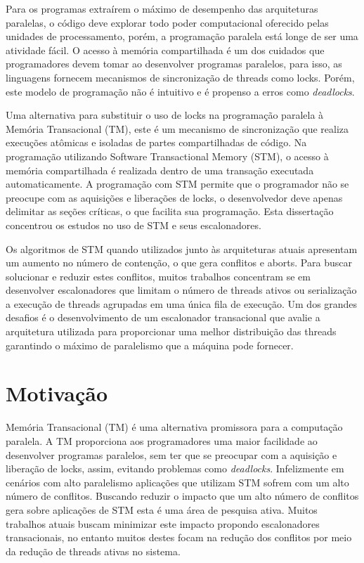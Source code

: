 \documentclass[diss,capa]{texufpel}
\begin{document}
Para os programas extraírem o máximo de desempenho das arquiteturas paralelas, o código deve explorar todo poder computacional oferecido pelas unidades de processamento, porém, a programação paralela está longe de ser uma atividade fácil. O acesso à memória compartilhada é um dos cuidados que programadores devem tomar ao desenvolver programas paralelos, para isso, as linguagens fornecem mecanismos de sincronização de threads como locks. Porém, este modelo de programação não é intuitivo e é propenso a erros como \emph{deadlocks}.


Uma alternativa para substituir o uso de locks na programação paralela à Memória Transacional (TM), este é um mecanismo de sincronização que realiza execuções atômicas e isoladas de partes compartilhadas de código. Na programação utilizando Software Transactional Memory (STM), o acesso à memória compartilhada é realizada dentro de uma transação executada automaticamente. A programação com STM permite que o programador não se preocupe com as aquisições e liberações de locks, o desenvolvedor deve apenas delimitar as seções críticas, o que facilita sua programação. Esta dissertação concentrou os estudos no uso de STM e seus escalonadores.

Os algoritmos de STM quando utilizados junto às arquiteturas atuais apresentam um aumento no número de contenção, o que gera conflitos e aborts. Para buscar solucionar e reduzir estes conflitos, muitos trabalhos concentram se em desenvolver escalonadores que limitam o número de threads ativos ou serialização a execução de threads agrupadas em uma única fila de execução. Um dos grandes desafios é o desenvolvimento de um escalonador transacional que avalie a arquitetura utilizada para proporcionar uma melhor distribuição das threads garantindo o máximo de paralelismo que a máquina pode fornecer.

\section{Motivação}

Memória Transacional (TM) é uma alternativa promissora para a computação paralela. A TM proporciona aos programadores uma maior facilidade ao desenvolver programas paralelos, sem ter que se preocupar com a aquisição e liberação de locks, assim, evitando problemas como \emph{deadlocks}. Infelizmente em cenários com alto paralelismo aplicações que utilizam STM sofrem com um alto número de conflitos. Buscando reduzir o impacto que um alto número de conflitos gera sobre aplicações de STM esta é uma área de pesquisa ativa. Muitos trabalhos atuais buscam minimizar este impacto propondo escalonadores transacionais, no entanto muitos destes focam na redução dos conflitos por meio da redução de threads ativas no sistema.
\end{document}

